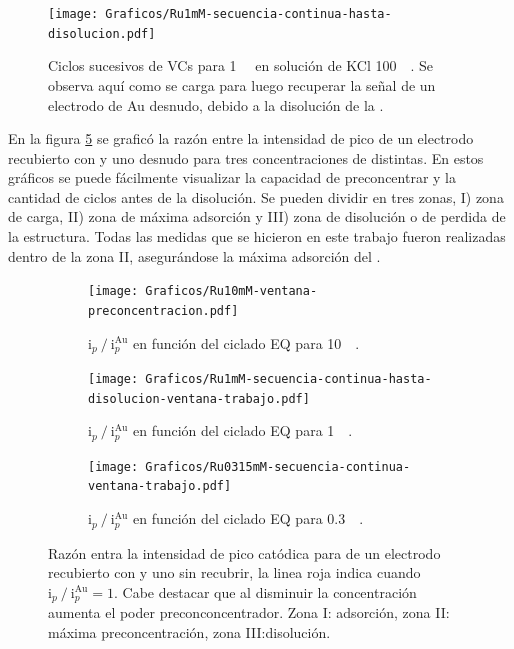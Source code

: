 			\begin{figure}[ht]
				\centering
		 	    \texttt{[image: Graficos/Ru1mM-secuencia-continua-hasta-disolucion.pdf]}
		        \caption[Disolución de una \pdmF\space en \ru.]{Ciclos sucesivos de VCs para \ru\space \SI{1}{\milli\Molar} en solución de KCl \SI{100}{\milli\Molar}. Se observa aquí como se carga para luego recuperar la señal de un electrodo de Au desnudo, debido a la disolución de la \pdmF.}
		        \label{fig:diso_ru1mM}
		      	\end{figure} 

		 En la figura \ref{fig:ventanas} se graficó la razón entre la intensidad de pico de un electrodo recubierto con \pdmF\space y uno desnudo para tres concentraciones de \ru\space distintas. En estos gráficos se puede fácilmente visualizar la capacidad de preconcentrar y la cantidad de ciclos antes de la disolución. Se pueden dividir en tres zonas, I) zona de carga, II) zona de máxima adsorción y III) zona de disolución o de perdida de la estructura. Todas las medidas que se hicieron en este trabajo fueron realizadas dentro de la zona II, asegurándose la máxima adsorción del \ru\space.

		 	\begin{figure}[th]
	 	   	    \begin{subfigure}[t]{0.325\textwidth}
		        	\texttt{[image: Graficos/Ru10mM-ventana-preconcentracion.pdf]}
		       		\caption{$\text{i}_p\mathbin{/}\text{i}_p^{\text{Au}}$ en función del ciclado EQ para \ru\space \SI{10}{\milli\Molar}.}
		         	\label{fig:Ventana_Ru10mM}
		     		\end{subfigure}
	     		\begin{subfigure}[t]{0.327\textwidth}
		        	\texttt{[image: Graficos/Ru1mM-secuencia-continua-hasta-disolucion-ventana-trabajo.pdf]}
		       		\caption{$\text{i}_p\mathbin{/}\text{i}_p^{\text{Au}}$ en función del ciclado EQ para \ru\space \SI{1}{\milli\Molar}.}
		         	\label{fig:Ventana_Ru1mM}
		     		\end{subfigure}
	     		\begin{subfigure}[t]{0.325\textwidth}
		        	\texttt{[image: Graficos/Ru0315mM-secuencia-continua-ventana-trabajo.pdf]}
		       		\caption{$\text{i}_p\mathbin{/}\text{i}_p^{\text{Au}}$ en función del ciclado EQ para \ru\space \SI{0.3}{\milli\Molar}.}
		         	\label{fig:Ventana_Ru0315mM}
		     		\end{subfigure}
	 	   	   	\caption[Intensidad en función del ciclado EQ para \pdmF]{Razón entra la intensidad de pico catódica para \ru\space de un electrodo recubierto con \pdm\space y uno sin recubrir, la linea roja indica cuando $\text{i}_p\mathbin{/}\text{i}_p^{\text{Au}} = 1$. Cabe destacar que al disminuir la concentración aumenta el poder preconconcentrador. Zona I: adsorción, zona II: máxima preconcentración, zona III:disolución.}
	     		\label{fig:ventanas}
	     	  \end{figure}


